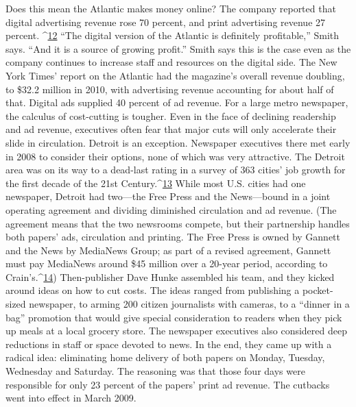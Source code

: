 Does this mean the Atlantic makes money online? The company reported that
digital advertising revenue rose 70 percent, and print advertising revenue 27 percent.
^{\href{#endnotes-ch7}{12}} ``The digital version of the Atlantic is definitely profitable,'' Smith says.
``And it is a source of growing profit.'' Smith says this is the case even as the
company continues to increase staff and resources on the digital side. The New
York Times’ report on the Atlantic had the magazine’s overall revenue doubling,
to \$32.2 million in 2010, with advertising revenue accounting for about half of
that. Digital ads supplied 40 percent of ad revenue.
For a large metro newspaper, the calculus of cost-cutting is tougher. Even in
the face of declining readership and ad revenue, executives often fear that major
cuts will only accelerate their slide in circulation.
Detroit is an exception. Newspaper executives there met early in 2008 to
consider their options, none of which was very attractive. The Detroit area was
on its way to a dead-last rating in a survey of 363 cities’ job growth for the first
decade of the 21st Century.^{\href{#endnotes-ch7}{13}} While most U.S. cities had one newspaper, Detroit
had two—the Free Press and the News—bound in a joint operating agreement
and dividing diminished circulation and ad revenue. (The agreement means that
the two newsrooms compete, but their partnership handles both papers’ ads, circulation
and printing. The Free Press is owned by Gannett and the News by MediaNews
Group; as part of a revised agreement, Gannett must pay MediaNews
around \$45 million over a 20-year period, according to Crain’s.^{\href{#endnotes-ch7}{14}})
Then-publisher Dave Hunke assembled his team, and they kicked around ideas
on how to cut costs. The ideas ranged from publishing a pocket-sized newspaper,
to arming 200 citizen journalists with cameras, to a ``dinner in a bag'' promotion
that would give special consideration to readers when they pick up meals at a
local grocery store. The newspaper executives also considered deep reductions in
staff or space devoted to news.
In the end, they came up with a radical idea: eliminating home delivery of
both papers on Monday, Tuesday, Wednesday and Saturday. The reasoning was
that those four days were responsible for only 23 percent of the papers’ print ad
revenue. The cutbacks went into effect in March 2009.

